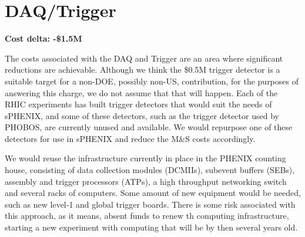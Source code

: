 \section*{DAQ/Trigger}
\label{daq}

\textbf{Cost delta: -\$1.5M}

The costs associated with the DAQ and Trigger are an area where
significant reductions are achievable.  Although we think the
\$0.5M trigger detector is a suitable target for a non-DOE, possibly
non-US, contribution, for the purposes of answering this charge, we do
not assume that that will happen.  Each of the RHIC experiments has
built trigger detectors that would suit the needs of sPHENIX, and some
of these detectors, such as the trigger detector used by PHOBOS, are
currently unused and available.  We would repurpose one of these
detectors for use in sPHENIX and reduce the M\&S costs accordingly.

We would reuse the infrastructure currently in place in the PHENIX
counting house, consisting of data collection modules (DCMIIs),
subevent buffers (SEBs), assembly and trigger processors (ATPs), a
high throughput networking switch and several racks of computers.
Some amount of new equipment would be needed, such as new level-1 and
global trigger boards.  There is some risk associated with this
approach, as it means, absent funds to renew th computing
infrastructure, starting a new experiment with computing that will be
by then several years old.



